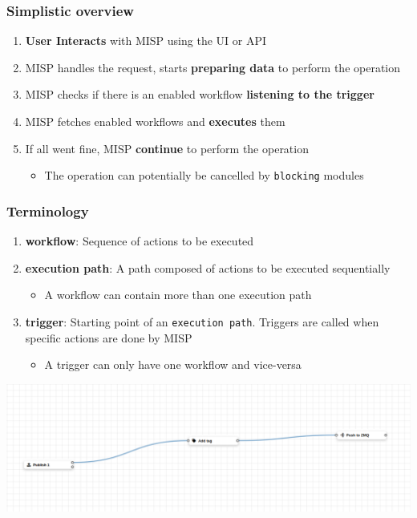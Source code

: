 \begin{frame}
    \frametitle{Simplistic overview}
    \begin{enumerate}
        \item \textbf{User Interacts} with MISP using the UI or API
        \item MISP handles the request, starts \textbf{preparing data} to perform the operation
        \item MISP checks if there is an enabled workflow \textbf{listening to the trigger}
        \item MISP fetches enabled workflows and \textbf{executes} them
        \item If all went fine, MISP \textbf{continue} to perform the operation
        \begin{itemize}
            \item The operation can potentially be cancelled by \texttt{blocking} modules
        \end{itemize}
    \end{enumerate}
\end{frame}

\begin{frame}
    \frametitle{Terminology}
    \begin{enumerate}
        \item \textbf{workflow}: Sequence of actions to be executed
        \item \textbf{execution path}: A path composed of actions to be executed sequentially
        \begin{itemize}
            \item A workflow can contain more than one execution path
        \end{itemize}
        \item \textbf{trigger}: Starting point of an \texttt{execution path}. Triggers are called when specific actions are done by MISP
        \begin{itemize}
            \item A trigger can only have one workflow and vice-versa
        \end{itemize}
    \end{enumerate}
    \begin{center}
        \includegraphics[width=1.0\linewidth]{pictures/workflow-view.png}
    \end{center}
\end{frame}

